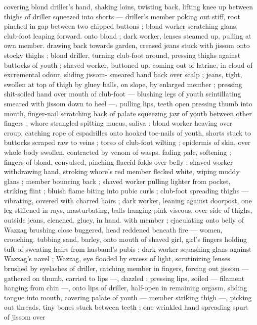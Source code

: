 covering blond driller's hand, shaking loins, twisting back, lifting 
knee up between thighs of driller squeezed into shorts --- driller's 
member poking out stiff, root pinched in gap between two chipped 
buttons ; blond worker scratching glans, club-foot leaping forward. 
onto blond ; dark worker, lenses steamed up, pulling at own member. 
drawing back towards garden, creased jeans stuck with jissom onto 
stocky thighs ; blond driller, turning club-foot around, pressing 
thighs against buttocks of youth ; shaved worker, buttoned up. 
coming out of latrine, in cloud of excremental odour, sliding jissom- 
smeared hand back over scalp ; jeans, tight, swollen at top of thigh 
by gluey balls, on slope, by enlarged member ; pressing shit-soiled 
hand over mouth of club-foot --- blushing legs of youth scintillating 
smeared with jissom down to heel ---. pulling lips, teeth open 
pressing thumb into mouth, finger-nail scratching back of palate 
squeezing jaw of youth between other fingers ; whore strangled 
spitting mucus, saliva : blond worker heaving over croup, catching 
rope of espadrilles onto hooked toe-nails of youth, shorts stuck to 
buttocks scraped raw to veins ; torso of club-foot wilting ; epidermis 
of skin, over whole body swollen, contracted by venom of wasps. 
fading pale, softening ; fingers of blond, convulsed, pinching flaccid 
folds over belly ; shaved worker withdrawing hand, stroking whore's 
red member flecked white, wiping muddy glans ; member bouncing 
back ; shaved worker pulling lighter from pocket, striking flint ; bluish 
flame biting into pubic curls ; club-foot spreading thighs --- 
vibrating, covered with charred hairs ; dark worker, leaning against 
doorpost, one leg stiffened in rays, masturbating, balls hanging pink 
viscous, over side of thighs, outside jeans, clenched, gluey, in hand. 
with member ; ejaculating onto belly of Wazzag brushing close 
buggered, head reddened beneath fire --- women, crouching. 
tubbing sand, barley, onto mouth of shaved girl, girl's fingers 
holding tuft of sweating hairs from husband's pubis ; dark worker 
squashing glans against Wazzag's navel ; Wazzag, eye flooded by 
excess of light, scrutinizing lenses brushed by eyelashes of driller, 
catching member in fingers, forcing out jissom --- gathered on 
thumb, carried to lips ---, dazzled ; pressing lips, soiled --- filament 
hanging from chin ---, onto lips of driller, half-open in remaining 
orgasm, sliding tongue into mouth, covering palate of youth --- 
member striking thigh ---, picking out threads, tiny bones stuck 
between teeth ; one wrinkled hand spreading spurt of jissom over 
